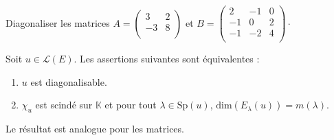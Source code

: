 \documentclass[a4paper,10pt]{report}
\begin{document}
\begin{ex}

\vspace{15cm}

\end{ex}

\newpage 

$\phantom{test}$
\vspace{19cm}
\begin{exa} Diagonaliser les matrices $A= \begin{pmatrix}
3 & 2 \\
-3 & 8 \\
\end{pmatrix}$ et $B = \begin{pmatrix}
2 & -1 & 0 \\
-1 & 0 & 2 \\
-1 & -2 & 4 \\
\end{pmatrix}\cdot$
\end{exa}


\begin{cor} Soit $u \in \mathcal{L}(E)$. Les assertions suivantes sont équivalentes : 

\begin{enumerate}
\item $u$ est diagonalisable.
\item $\chi_u$ est scindé sur $\mathbb{K}$ et pour tout $\lambda \in \textrm{Sp}(u)$, $\textrm{dim}(E_{\lambda}(u))= m(\lambda)$.
\end{enumerate}
Le résultat est analogue pour les matrices.
\end{cor}
\end{document}
